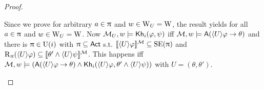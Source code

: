 \begin{proof}
\begin{itemize}
Since we prove for arbitrary $a \in \uppi$ and $w \in \operatorname{W}_{{U}} = \operatorname{W}$, the result yields for all $a \in \uppi$ and $w \in \operatorname{W}_{{U}} = \operatorname{W}$.
Now $\mathcal{M}_{{U}},w \models {\sf Kh}_i(\varphi,\psi)$ iff $\mathcal{M},w \models {\sf A}(\langle U \rangle\varphi \rightarrow \theta)$ and there is $\uppi \in \operatorname{U}(i)$ with $\uppi \subseteq {\rm \sf Act}$ s.t. $\llbracket \langle U \rangle\varphi \rrbracket^{\mathcal{M}} \subseteq \operatorname{SE}(\uppi)$ and $\operatorname{R}_\uppi(\langle U \rangle\varphi) \subseteq \llbracket \theta' \wedge \langle U \rangle\psi \rrbracket^{\mathcal{M}}$.
This happens iff $\mathcal{M},w \models ({\sf A}(\langle U \rangle\varphi \rightarrow \theta) \wedge {\sf Kh}_i(\langle U \rangle\varphi,\theta' \wedge \langle U \rangle\psi))$ with $U = (\theta,\theta')$.
\end{itemize}
\end{proof}

